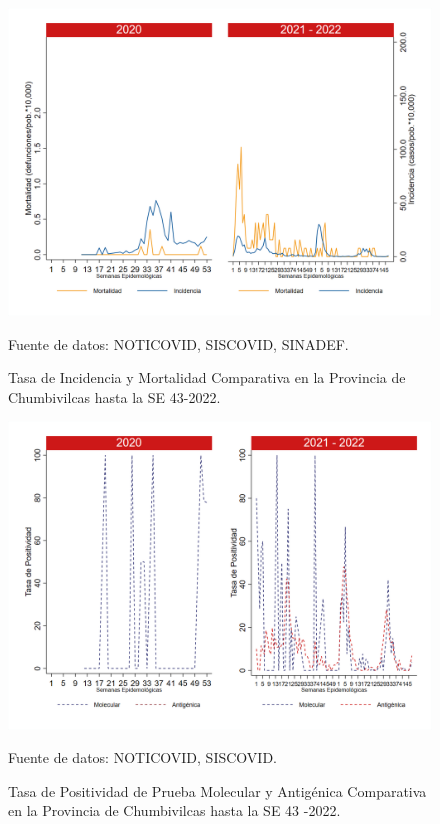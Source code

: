 \documentclass[12pt,a4paper,openany]{book}
\begin{document}
	\begin{figure}[h]
		\caption{Tasa de Incidencia y Mortalidad Comparativa en la Provincia de Chumbivilcas hasta la SE 43-2022.}\label{fig:inc_mort_chumbivilcas}
		\begin{center}
			\includegraphics[width=0.85\linewidth]{../figuras/incidencia_mortalidad_20_21_6.png}
		\end{center}
		{\footnotesize {Fuente de datos: NOTICOVID, SISCOVID, SINADEF.}}
	\end{figure}
	
	\begin{figure}[h]
		\caption{Tasa de Positividad de Prueba Molecular y Antigénica Comparativa en la Provincia de Chumbivilcas hasta la SE 43  -2022.}\label{fig:positividad_chumbivilcas}
		\begin{center}
			\includegraphics[width=0.7\linewidth]{../figuras/positividad_20_21_6.png}
		\end{center}
		{\footnotesize {Fuente de datos: NOTICOVID, SISCOVID.}}
	\end{figure}
	
\end{document}
